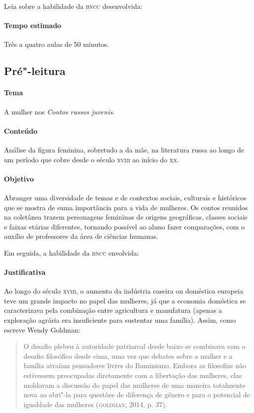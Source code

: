 \documentclass[11pt]{extarticle}
\begin{document}
Leia sobre a habilidade da \textsc{bncc} desenvolvida:

\paragraph{Tempo estimado} Três a quatro aulas de 50 minutos.



\subsection{Pré"-leitura}

\paragraph{Tema} A mulher nos \emph{Contos russos juvenis}.

\paragraph{Conteúdo}
Análise da figura feminina, sobretudo a da mãe, na literatura russa ao
longo de um período que cobre desde o século \textsc{xviii} ao início do \textsc{xx}.

\paragraph{Objetivo}
Abranger uma diversidade de temas e de contextos sociais, culturais e
históricos que se mostra de suma importância para a vida de mulheres. Os
contos reunidos na coletânea trazem personagens femininas de origens
geográficas, classes sociais e faixas etárias diferentes, tornando
possível ao aluno fazer comparações, com o auxílio de professores da área de ciências humanas.

Em seguida, a habilidade da \textsc{bncc} envolvida:

\paragraph{Justificativa}
Ao longo do século \textsc{xviii}, o aumento da indústria caseira ou doméstica
europeia teve um grande impacto no papel das mulheres, já que a economia
doméstica se caracterizava pela combinação entre agricultura e
manufatura (apenas a exploração agrária era insuficiente para sustentar
uma família). Assim, como escreve Wendy Goldman:

\begin{quote}
O desafio plebeu à autoridade patriarcal desde baixo se combinava com o
desafio filosófico desde cima, uma vez que debates sobre a mulher e a
família atraíam pensadores livres do Iluminismo. Embora as filosofias
não estivessem preocupadas diretamente com a libertação das mulheres,
elas moldavam a discussão do papel das mulheres de uma maneira
totalmente nova ao abri"-la para questões de diferença de gênero e para o
potencial de igualdade das mulheres (\textsc{goldman}, 2014, p. 37).
\end{quote}
\end{document}
